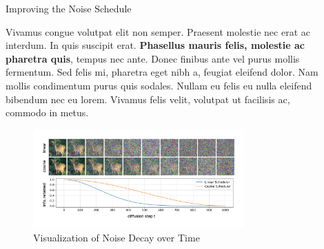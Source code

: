 \documentclass[final]{beamer}
\newlength{\sepwidth}
\newlength{\colwidth}
\newcommand{\separatorcolumn}{\begin{column}{\sepwidth}\end{column}}
\begin{document}
\begin{frame}[t]
\begin{columns}[t]
\begin{column}{\colwidth}




		\end{column}

		\separatorcolumn

		\begin{column}{\colwidth}

			\begin{block}{Improving the Noise Schedule}

				Vivamus congue volutpat elit non semper. Praesent molestie nec erat ac
				interdum. In quis suscipit erat. \textbf{Phasellus mauris felis, molestie
					ac pharetra quis}, tempus nec ante. Donec finibus ante vel purus mollis
				fermentum. Sed felis mi, pharetra eget nibh a, feugiat eleifend dolor. Nam
				mollis condimentum purus quis sodales. Nullam eu felis eu nulla eleifend
				bibendum nec eu lorem. Vivamus felis velit, volutpat ut facilisis ac,
				commodo in metus.

				\begin{figure}[h]
					\centering
					\includegraphics[width=0.8\textwidth]{figs/noise_decay.png}
					\caption{Visualization of Noise Decay over Time}
					\label{fig:noise_decay}
				\end{figure}


\end{block}
\end{column}
\end{columns}
\end{frame}
\end{document}
